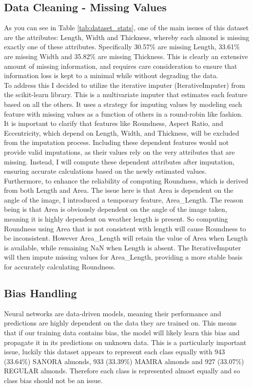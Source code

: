 \documentclass[conference]{IEEEtran}
\begin{document}
\subsection{Data Cleaning - Missing Values}
As you can see in Table \ref{tab:dataset_stats}, one of the main issues of this dataset are the attributes: Length, Width and Thickness, whereby each almond is missing exactly one of these attributes. Specifically 30.57\% are missing Length, 33.61\% are missing Width and 35.82\% are missing Thickness. This is clearly an extensive amount of missing information, and requires care consideration to ensure that information loss is kept to a minimal while without degrading the data.
\newline \\
To address this I decided to utilize the iterative imputer (IterativeImputer) from the scikit-learn library. This is a multivariate imputer that estimates each feature based on all the others. It uses a strategy for imputing values by modeling each feature with missing values as a function of others in a round-robin like fashion.
\newline \\
It is important to clarify that features like Roundness, Aspect Ratio, and Eccentricity, which depend on Length, Width, and Thickness, will be excluded from the imputation process. Including these dependent features would not provide valid imputations, as their values rely on the very attributes that are missing. Instead, I will compute these dependent attributes after imputation, ensuring accurate calculations based on the newly estimated values.
\newline \\
Furthermore, to enhance the reliability of computing Roundness, which is derived from both Length and Area. The issue here is that Area is dependent on the angle of the image, I introduced a temporary feature, Area\_Length. The reason being is that Area is obviously dependent on the angle of the image taken, meaning it is highly dependent on weather length is present. So computing Roundness using Area that is not consistent with length will cause Roundness to be inconsistent. However Area\_Length will retain the value of Area when Length is available, while remaining NaN when Length is absent. The IterativeImputer will then impute missing values for Area\_Length, providing a more stable basis for accurately calculating Roundness.

\subsection{Bias Handling}
Neural networks are data-driven models, meaning their performance and predictions are highly dependent on the data they are trained on. This means that if our training data contains bias, the model will likely learn this bias and propagate it in its predictions on unknown data. This is a particularly important issue, luckily this dataset appears to represent each class equally with 943 (33.64\%) SANORA almonds, 933 (33.39\%) MAMRA almonds and 927 (33.07\%) REGULAR almonds. Therefore each class is represented almost equally and so class bias should not be an issue.
\end{document}
